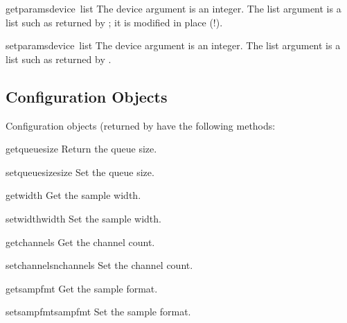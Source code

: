 \begin{funcdesc}{getparams}{device\, list}
The device argument is an integer.  The list argument is a list such
as returned by ; it is modified in place (!).
\end{funcdesc}

\begin{funcdesc}{setparams}{device\, list}
The device argument is an integer.  The list argument is a list such
as returned by .
\end{funcdesc}

\subsection{Configuration Objects}

Configuration objects (returned by  have the
following methods:

\renewcommand{\indexsubitem}{(audio configuration object method)}

\begin{funcdesc}{getqueuesize}{}
Return the queue size.
\end{funcdesc}

\begin{funcdesc}{setqueuesize}{size}
Set the queue size.
\end{funcdesc}

\begin{funcdesc}{getwidth}{}
Get the sample width.
\end{funcdesc}

\begin{funcdesc}{setwidth}{width}
Set the sample width.
\end{funcdesc}

\begin{funcdesc}{getchannels}{}
Get the channel count.
\end{funcdesc}

\begin{funcdesc}{setchannels}{nchannels}
Set the channel count.
\end{funcdesc}

\begin{funcdesc}{getsampfmt}{}
Get the sample format.
\end{funcdesc}

\begin{funcdesc}{setsampfmt}{sampfmt}
Set the sample format.
\end{funcdesc}

